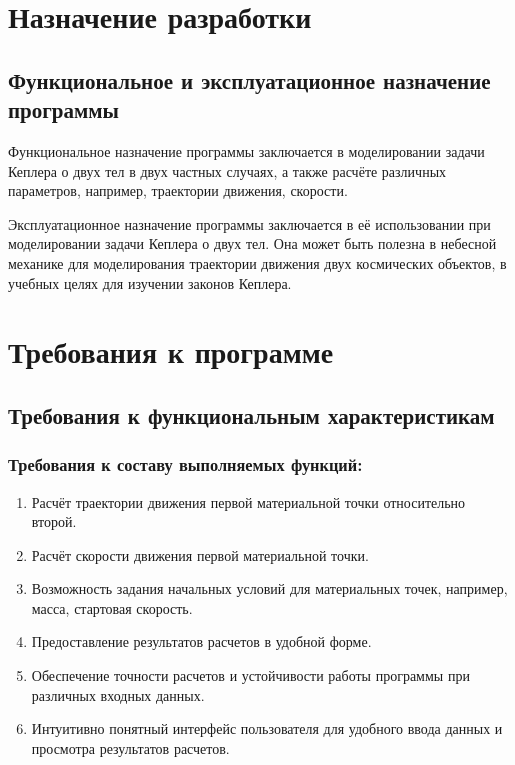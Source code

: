  \section{Назначение разработки}
 \subsection{Функциональное и эксплуатационное назначение программы}
 Функциональное назначение программы заключается в моделировании задачи Кеплера о двух тел в двух частных случаях, а также расчёте различных параметров, например, траектории движения, скорости.

 Эксплуатационное назначение программы заключается в её использовании при моделировании задачи Кеплера о двух тел. Она может быть полезна в небесной механике для моделирования траектории движения двух космических объектов, в учебных целях для изучении законов Кеплера.
 \section{Требования к программе}
 \subsection{Требования к функциональным характеристикам}

 \subsubsection{Требования к составу выполняемых функций:}

 \begin{enumerate}
  \item Расчёт траектории движения первой материальной точки относительно второй.
  \item Расчёт скорости движения первой материальной точки.
  \item Возможность задания начальных условий для материальных точек, например, масса, стартовая скорость.
  \item Предоставление результатов расчетов в удобной форме.
  \item Обеспечение точности расчетов и устойчивости работы программы при различных входных данных.
  \item Интуитивно понятный интерфейс пользователя для удобного ввода данных и просмотра результатов расчетов.
 \end{enumerate}

